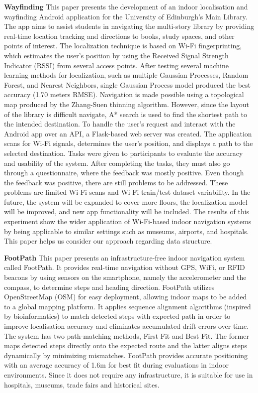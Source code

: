 \documentclass[conference]{IEEEtran}
\begin{document}
	\textbf{Wayfinding}
	This paper presents the development of an indoor localisation and wayfinding Android application for the University of Edinburgh’s Main Library. The app aims to assist students in navigating the multi-story library by providing real-time location tracking and directions to books, study spaces, and other points of interest. The localization technique is based on Wi-Fi fingerprinting, which estimates the user's position by using the Received Signal Strength Indicator (RSSI) from several access points. After testing several machine learning methods for localization, such as multiple Gaussian Processes, Random Forest, and Nearest Neighbors, single Gaussian Process model produced the best accuracy (1.70 meters RMSE). Navigation is made possible using a topological map produced by the Zhang-Suen thinning algorithm. However, since the layout of the library is difficult navigate, A* search is used to find the shortest path to the intended destination.
	To handle the user's request and interact with the Android app over an API, a Flask-based web server was created. The application scans for Wi-Fi signals, determines the user’s position, and displays a path to the selected destination. Tasks were given to participants to evaluate the accuracy and usability of the system. After completing the tasks, they must also go through a questionnaire, where the feedback was mostly positive. Even though the feedback was positive, there are still problems to be addressed. These problems are limited Wi-Fi scans and Wi-Fi train/test dataset variability. In the future, the system will be expanded to cover more floors, the localization model will be improved, and new app functionality will be included. The results of this experiment show the wider application of Wi-Fi-based indoor navigation systems by being applicable to similar settings such as museums, airports, and hospitals. This paper helps us consider our approach regarding data structure.
	
	\textbf{FootPath}
	This paper presents an infrastructure-free indoor navigation system called FootPath. It provides real-time navigation without GPS, WiFi, or RFID beacons by using sensors on the smartphone, namely the accelerometer and the compass, to determine steps and heading direction. FootPath utilizes OpenStreetMap (OSM) for easy deployment, allowing indoor maps to be added to a global mapping platform. It applies sequence alignment algorithms (inspired by bioinformatics) to match detected steps with expected path in order to improve localisation accuracy and eliminates accumulated drift errors over time. The system has two path-matching methods, First Fit and Best Fit. The former maps detected steps directly onto the expected route and the latter aligns steps dynamically by minimizing mismatches. FootPath provides accurate positioning with an average accuracy of 1.6m for best fit during evaluations in indoor environments. Since it does not require any infrastructure, it is suitable for use in hospitals, museums, trade fairs and historical sites.
	
\end{document}
